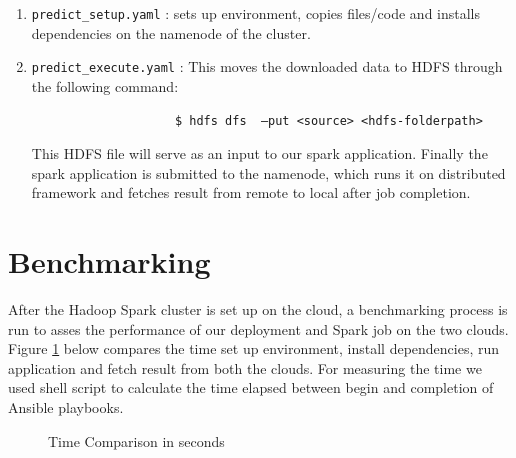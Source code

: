 \documentclass[9pt,twocolumn,twoside]{../../styles/osajnl}
\begin{document}
\begin{enumerate}
\begin{enumerate}
					\item \verb|predict_setup.yaml| :  sets up environment, copies files/code and installs dependencies on the namenode of the cluster. 
					
					
					\item \verb|predict_execute.yaml| :   
					This moves the downloaded data to HDFS through the following command:
					\begin{verbatim}
					$ hdfs dfs  –put <source> <hdfs-folderpath>
					\end{verbatim}
					
					This HDFS file will serve as an input to our spark application. Finally the spark application is submitted to the namenode, which runs it on distributed framework and fetches result from remote to local after job completion.

			\end{enumerate}
			
	\end{enumerate}
		



 \section{Benchmarking}
	After the Hadoop Spark cluster is set up on the cloud, a benchmarking process is run to asses the performance of our deployment and Spark job on the two clouds. Figure \ref{Benchmark2} below compares the time set up environment, install dependencies, run application and fetch result from both the clouds. For measuring the time we used shell script to calculate the time elapsed between begin and completion of Ansible playbooks.
		\begin{figure}[htbp]
			\centering
			\caption{Time Comparison in seconds}
			\label{Benchmark2}
		\end{figure}
	
\end{document}

